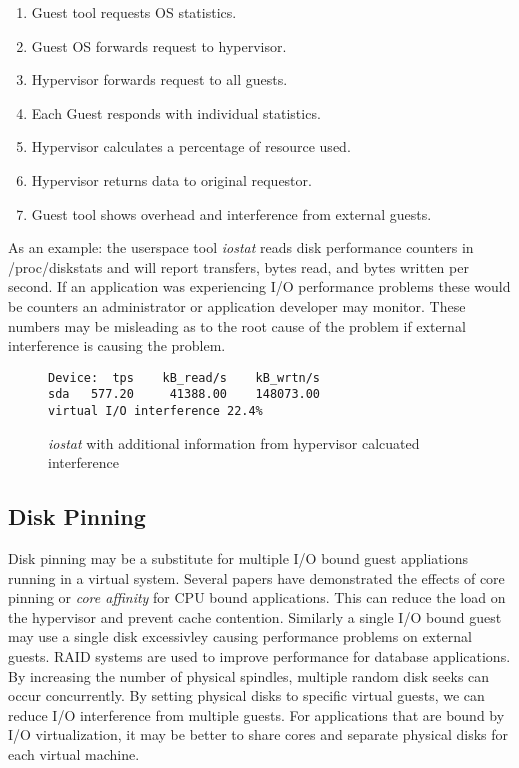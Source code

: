 \begin{enumerate}
	\item Guest tool requests OS statistics.
	\item Guest OS forwards request to hypervisor.
	\item Hypervisor forwards request to all guests.
	\item Each Guest responds with individual statistics.
	\item Hypervisor calculates a percentage of resource used.
	\item Hypervisor returns data to original requestor.
	\item Guest tool shows overhead and interference from external guests.
\end{enumerate}

As an example: the userspace tool \emph{iostat} reads disk performance counters in /proc/diskstats and will report transfers, bytes read, and bytes written per second.  If an application was experiencing I/O performance problems these would be counters an administrator or application developer may monitor.  These numbers may be misleading as to the root cause of the problem if external interference is causing the problem.  
\begin{figure}
\begin{Verbatim}
Device:  tps    kB_read/s    kB_wrtn/s
sda   577.20     41388.00    148073.00
virtual I/O interference 22.4%     
\end{Verbatim}
\label{fig:iostat}
\caption{\emph{iostat} with additional information from hypervisor calcuated interference}
\end{figure}

\subsection{Disk Pinning}
Disk pinning may be a substitute for multiple I/O bound guest appliations running in a virtual system.  Several papers have demonstrated the effects of core pinning or \emph{core affinity} for CPU bound applications.  This can reduce the load on the hypervisor and prevent cache contention.  Similarly a single I/O bound guest may use a single disk excessivley causing performance problems on external guests.  RAID systems are used to improve performance for database applications.  By increasing the number of physical spindles, multiple random disk seeks can occur concurrently.  By setting physical disks to specific virtual guests, we can reduce I/O interference from multiple guests.  For applications that are bound by I/O virtualization, it may be better to share cores and separate physical disks for each virtual machine.
